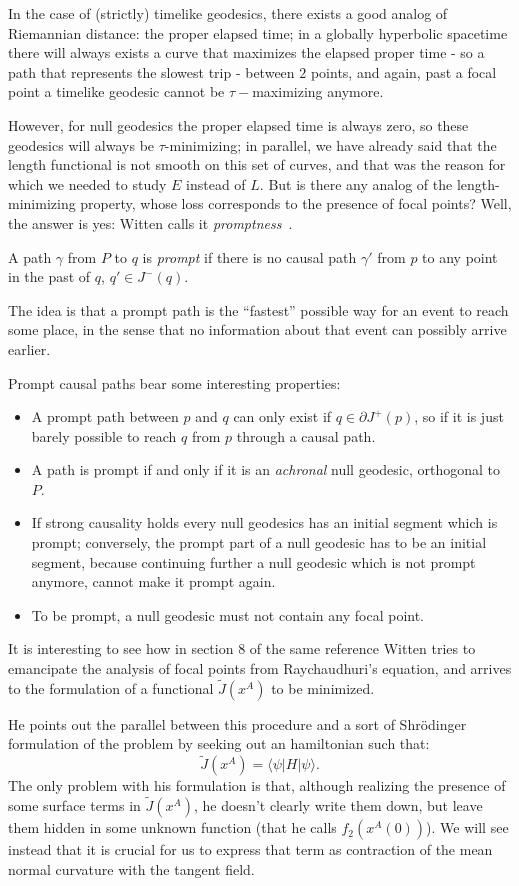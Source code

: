 In the case of (strictly) timelike geodesics, there exists a good analog of Riemannian distance: the proper elapsed time; in a globally hyperbolic spacetime there will always exists a curve that maximizes the elapsed proper time - so a path that represents the slowest trip - between \(2\) points, and again, past a focal point a timelike geodesic cannot be \(\tau-\)maximizing anymore.

However, for null geodesics the proper elapsed time is always zero, so these geodesics will always be \(\tau\)-minimizing; in parallel, we have already said that the length functional is not smooth on this set of curves, and that was the reason for which we needed to study \(E\) instead of \(L\). But is there any analog of the length-minimizing property, whose loss corresponds to the presence of focal points? Well, the answer is yes: Witten calls it \emph{promptness}~\cite{witten2020light}.

\begin{definition}
	A path \(\gamma\) from \(P\) to \(q\) is \emph{prompt} if there is no causal path \(\gamma'\) from \(p\) to any point in the past of \(q\), \(q'\in J^-(q)\).
\end{definition}

The idea is that a prompt path is the ``fastest'' possible way for an event to reach some place, in the sense that no information about that event can possibly arrive earlier.

\noindent Prompt causal paths bear some interesting properties:
\begin{itemize}
	\item[\ding{99}] A prompt path between \(p\) and \(q\) can only exist if \(q\in\partial J^+(p)\), so if it is just barely possible to reach \(q\) from \(p\) through a causal path.
	\item[\ding{99}] A path is prompt if and only if it is an \emph{achronal} null geodesic, orthogonal to \(P\).
	\item[\ding{99}] If strong causality holds every null geodesics has an initial segment which is prompt; conversely, the prompt part of a null geodesic has to be an initial segment, because continuing further a null geodesic which is not prompt anymore, cannot make it prompt again.
	\item[\ding{99}] To be prompt, a null geodesic must not contain any focal point.
\end{itemize}

It is interesting to see how in section \(8\) of the same reference Witten tries to emancipate the analysis of focal points from Raychaudhuri's equation, and arrives to the formulation of a functional \(\tilde{J}(x^A)\) to be minimized.

He points out the parallel between this procedure and a sort of Shr\"odinger formulation of the problem by seeking out an hamiltonian such that:
\[
	\tilde{J}(x^A) = \langle \psi \vert H \vert \psi \rangle.	
\]
The only problem with his formulation is that, although realizing the presence of some surface terms in \(\tilde{J}(x^A)\), he doesn't clearly write them down, but leave them hidden in some unknown function (that he calls \(f_2(x^A(0))\)). We will see instead that it is crucial for us to express that term as contraction of the mean normal curvature with the tangent field.
